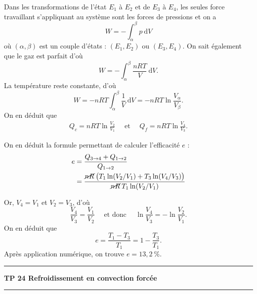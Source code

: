 \documentclass[a4paper]{report}
\let\bf\bfseries
\begin{document}
\begin{multicols}{2}
		Dans les transformations de l'état $E_1$ à $E_2$ et de $E_3$ à $E_4$, les seules force travaillant s'appliquant au système sont les forces de pressions et on a \[
			W = -\int_{\alpha}^{\beta} p~\mathrm{d}V
		\] où $(\alpha, \beta)$ est un couple d'états : $(E_1,E_2)$ ou $(E_3, E_4)$. On sait également que le gaz est parfait d'où \[
			W = -\int_{\alpha}^{\beta} \frac{nRT}{V}~\mathrm{d}V
		.\] La température reste constante, d'où \[
			W = -nRT \int_{\alpha}^{\beta} \frac{1}{V}~\mathrm{d}V = -nRT \ln \frac{V_{\alpha}}{V_{\beta}}
		.\] On en déduit que
		\begin{align*}
			Q_c = nRT \ln \frac{V_2}{V_1}\quad \text{ et }\quad Q_f = nRT \ln \frac{V_4}{V_3}.
		\end{align*}

		On en déduit la formule permettant de calculer l'efficacité $e$ :
		\begin{align*}
			e &= \frac{Q_{3\to 4} + Q_{1\to 2}}{Q_{1\to 2}}\\
				&= \frac{\cancel{nR}\:\big(T_1 \ln(V_2 / V_1) + T_3 \ln(V_4/ V_3)\big)}{\cancel{nR}\:T_1 \ln(V_2 / V_1)} \\
		\end{align*}

		Or, $V_4 = V_1$ et $V_2 = V_3$, d'où \[
			\frac{V_4}{V_3} = \frac{V_1}{V_2}\quad\text{ et donc }\quad \ln \frac{V_4}{V_3} = - \ln \frac{V_2}{V_1}
		.\] On en déduit que \[
			e = \frac{T_1 - T_3}{T_1} = 1 - \frac{T_3}{T_1}
		.\] Après application numérique, on trouve $e = 13,\!2\:\%$.
	\end{multicols}

	\vspace{2.5mm}
	\par\noindent\rule{\textwidth}{0.4pt}
	{\Large \bf TP 24 \hfill Refroidissement en convection forcée \hfill \phantom{TP 24}}\\[-3mm]
	\rule{\textwidth}{0.4pt}
	\vspace{2.5mm}
\end{document}
